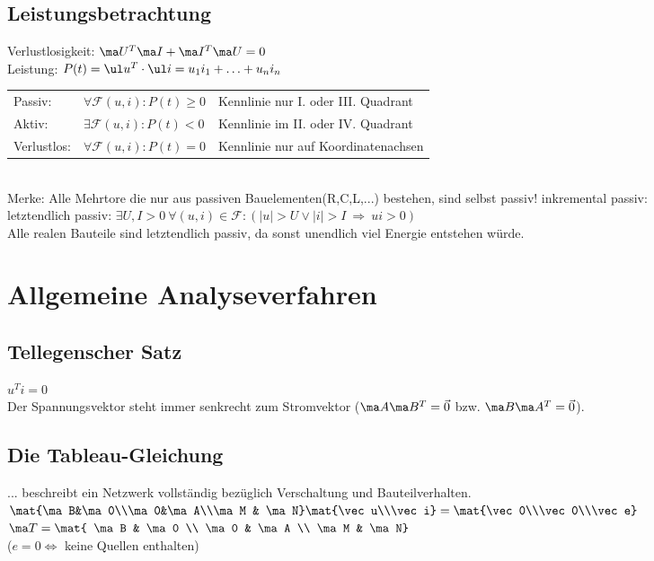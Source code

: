 \documentclass[fs, footer]{latex4ei}
\begin{document}
\begin{multicols*}{4}
    \subsection{Leistungsbetrachtung}
    Verlustlosigkeit: $\ma U^T\ma I + \ma I^T \ma U = 0$\\
    Leistung: $P(t)=\ul u^T \cdot \ul i=u_1 i_1 + \dotsc + u_n i_n$ \\
    \begin{tabular*}{\columnwidth}{@{\extracolsep\fill}lll@{}}
        Passiv: & $\forall \mathcal F(u,i): P(t)\ge 0$ & Kennlinie nur I. oder III. Quadrant\\
        Aktiv: & $\exists \mathcal F(u,i): P(t)<0$ & Kennlinie im II. oder IV. Quadrant\\
        Verlustlos: & $\forall \mathcal F(u,i): P(t)=0$ & Kennlinie nur auf Koordinatenachsen\\
    \end{tabular*}\\
    Merke: Alle Mehrtore die nur aus passiven Bauelementen(R,C,L,...) bestehen, sind selbst passiv!
    inkremental passiv:\\
    letztendlich passiv: $\exists U,I>0 \ \forall (u,i) \in \mathcal F : (|u| > U \lor |i| > I \ \Rightarrow \ ui > 0)$\\
    Alle realen Bauteile sind letztendlich passiv, da sonst unendlich viel Energie entstehen würde.\\


    \section{Allgemeine Analyseverfahren}

    \subsection{Tellegenscher Satz}
    $u^Ti = 0$\\
    Der Spannungsvektor steht immer senkrecht zum Stromvektor ($\ma A\ma B^T = \vec 0$ bzw. $\ma B\ma A^T = \vec 0$).

    \subsection{Die Tableau-Gleichung}
    ... beschreibt ein Netzwerk vollständig bezüglich Verschaltung und Bauteilverhalten.\\
    $\mat{\ma B&\ma 0\\\ma 0&\ma A\\\ma M & \ma N}\mat{\vec u\\\vec i} = \mat{\vec 0\\\vec 0\\\vec e}$\qquad
    $\ma T = \mat{ \ma B & \ma 0 \\ \ma 0 & \ma A \\ \ma M & \ma N}$\\
    ($e = 0 \Leftrightarrow$ keine Quellen enthalten)


\end{multicols*}
\end{document}
